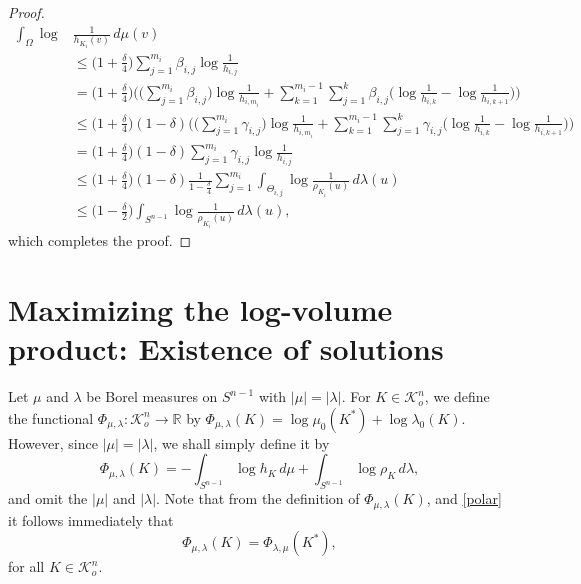 \documentclass{cpamart1}     %
\theoremstyle{definition}
\theoremstyle{remark}
\newcommand{\sn}{S^{n-1}}
\newcommand{\kno}{\mathcal K^n_o}
\begin{document}
\begin{proof}
\begin{align*}
\int_{\Omega}\log&\frac1{h_{K_i}(v)}\,d\mu(v)\\
&\leq
\big(1+{\textstyle\frac\delta 4}\big)\sum_{j=1}^{m_i}\beta_{i,j}\log \frac1{h_{i,j}}\\
&=\big(1+{\textstyle\frac\delta 4}\big)
\bigg(\Big(\sum_{j=1}^{m_i}\beta_{i,j}\Big)\log \frac1{h_{i,m_i}}+
\sum_{k=1}^{m_i-1}\sum_{j=1}^{k}\beta_{i,j} \Big(\log \frac1{h_{i,k}}-\log\frac1{h_{i,k+1}}\Big)
 \bigg)\\
&\leq \big(1+{\textstyle\frac\delta 4}\big)\left(1-\delta\right)
\bigg(\Big(\sum_{j=1}^{m_i}\gamma_{i,j}\Big)\log \frac1{h_{i,m_i}}+
\sum_{k=1}^{m_i-1}\sum_{j=1}^{k}\gamma_{i,j} \Big(\log \frac1{h_{i,k}}-\log
\frac1{h_{i,k+1}}\Big)  \bigg)\\
&=\big(1+{\textstyle\frac\delta 4}\big)\left(1-\delta\right)
\sum_{j=1}^{m_i}\gamma_{i,j}\log \frac1{h_{i,j}}\\
&\leq\big(1+{\textstyle\frac\delta 4}\big)\left(1-\delta\right)
\frac{1}{1-\frac{\delta}{4}}\sum_{j=1}^{m_i}
\int_{\Theta_{i,j}}\log\frac1{\rho_{K_i}(u)}\,d\lambda(u)\\
&\leq\big(1-{\textstyle\frac\delta 2}\big)\int_{S^{n-1}}\log\frac1{\rho_{K_i}(u)}\,d\lambda(u),
\end{align*}
which completes the proof.
\end{proof}




\section{Maximizing the log-volume product: Existence of solutions}

Let $\mu$ and $\lambda$ be Borel measures on $\sn$ with $|\mu|=|\lambda|$.
For  $K\in \mathcal{K}_o^n$, we define the functional
 $\Phi_{\mu, \lambda}:\mathcal{K}_o^n\rightarrow \mathbb{R}$ by $\Phi_{\mu, \lambda}(K)=\log\mu_0(K^*) +  \log\lambda_0(K)$. However, since $|\mu|=|\lambda|$, we shall simply define it by
\begin{equation*}
\Phi_{\mu,\lambda}(K)= -\int_{S^{n-1}}\log h_K \, d\mu +\int_{S^{n-1}}\log \rho_K \, d\lambda,
\end{equation*}
and omit the $|\mu|$ and $|\lambda|$.
Note that from the definition of $\Phi_{\mu,\lambda}(K)$, and \eqref{polar} it follows immediately that
\begin{equation}\label{recippolar}
\Phi_{\mu,\lambda}(K) = \Phi_{\lambda,\mu}(K^*),
\end{equation}
for all $K\in\kno$.
\end{document}
